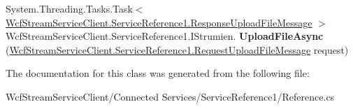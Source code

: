 \begin{DoxyCompactItemize}
System.\+Threading.\+Tasks.\+Task$<$ \hyperlink{class_wcf_stream_service_client_1_1_service_reference1_1_1_response_upload_file_message}{Wcf\+Stream\+Service\+Client.\+Service\+Reference1.\+Response\+Upload\+File\+Message} $>$ Wcf\+Stream\+Service\+Client.\+Service\+Reference1.\+I\+Strumien. {\bfseries Upload\+File\+Async} (\hyperlink{class_wcf_stream_service_client_1_1_service_reference1_1_1_request_upload_file_message}{Wcf\+Stream\+Service\+Client.\+Service\+Reference1.\+Request\+Upload\+File\+Message} request)
\end{DoxyCompactItemize}


The documentation for this class was generated from the following file\+:\begin{DoxyCompactItemize}
\item 
Wcf\+Stream\+Service\+Client/\+Connected Services/\+Service\+Reference1/Reference.\+cs\end{DoxyCompactItemize}
